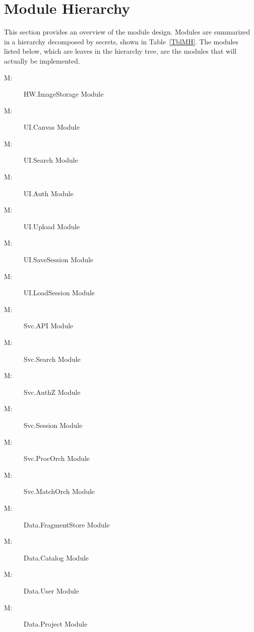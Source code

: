 \documentclass[12pt, titlepage]{article}
\newcounter{mnum}
\newcommand{\mthemnum}{M\themnum}
\begin{document}
\section{Module Hierarchy} \label{SecMH}

This section provides an overview of the module design. Modules are summarized
in a hierarchy decomposed by secrets, shown in Table~\ref{TblMH}. The modules listed
below, which are leaves in the hierarchy tree, are the modules that will
actually be implemented.

\begin{description}
\item [ \mthemnum \label{mHWImageStorage}:] HW.ImageStorage Module
\item [ \mthemnum \label{mCanvas}:] UI.Canvas Module
\item [ \mthemnum \label{mSearch}:] UI.Search Module
\item [ \mthemnum \label{mAuth}:] UI.Auth Module
\item [ \mthemnum \label{mUpload}:] UI.Upload Module
\item [ \mthemnum \label{mSaveSession}:] UI.SaveSession Module
\item [ \mthemnum \label{mLoadSession}:] UI.LoadSession Module
\item [ \mthemnum \label{mAPI}:] Svc.API Module
\item [ \mthemnum \label{mSearchSvc}:] Svc.Search Module
\item [ \mthemnum \label{mAuthZ}:] Svc.AuthZ Module
\item [ \mthemnum \label{mSession}:] Svc.Session Module
\item [ \mthemnum \label{mProcOrch}:] Svc.ProcOrch Module
\item [ \mthemnum \label{mMatchOrch}:] Svc.MatchOrch Module
\item [ \mthemnum \label{mFragStore}:] Data.FragmentStore Module
\item [ \mthemnum \label{mCatalog}:] Data.Catalog Module
\item [ \mthemnum \label{mUser}:] Data.User Module
\item [ \mthemnum \label{mProject}:] Data.Project Module

\end{description}
\end{document}
